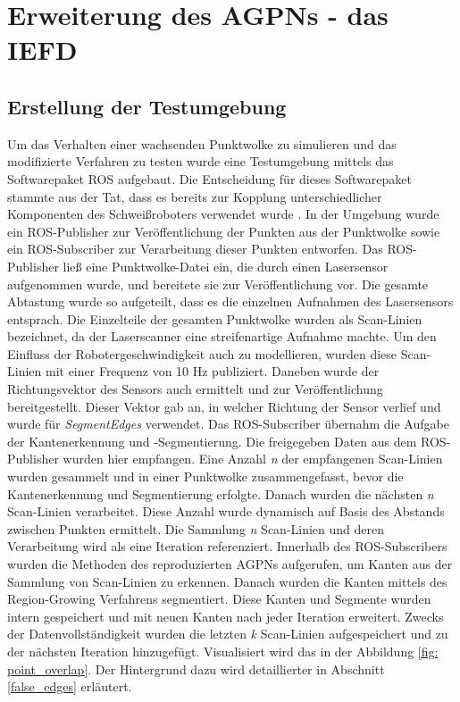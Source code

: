 \section{Erweiterung des AGPNs - das IEFD}
\subsection{Erstellung der Testumgebung}
Um das Verhalten einer wachsenden Punktwolke zu simulieren und das modifizierte Verfahren zu testen wurde eine Testumgebung mittels das Softwarepaket ROS aufgebaut. Die Entscheidung für dieses Softwarepaket stammte aus der Tat, dass es bereits zur Kopplung unterschiedlicher Komponenten des Schweißroboters verwendet wurde \autocite[39]{savla_intelligente_2022}. In der Umgebung wurde ein ROS-Publisher zur Veröffentlichung der Punkten aus der Punktwolke sowie ein ROS-Subscriber zur Verarbeitung dieser Punkten entworfen. Das ROS-Publisher ließ eine Punktwolke-Datei ein, die durch einen Lasersensor aufgenommen wurde, und bereitete sie zur Veröffentlichung vor. Die gesamte Abtastung wurde so aufgeteilt, dass es die einzelnen Aufnahmen des Lasersensors entsprach. Die Einzelteile der gesamten Punktwolke wurden als Scan-Linien bezeichnet, da der Laserscanner eine streifenartige Aufnahme machte. Um den Einfluss der Robotergeschwindigkeit auch zu modellieren, wurden diese Scan-Linien mit einer Frequenz von 10 Hz publiziert. Daneben wurde der Richtungsvektor des Sensors auch ermittelt und zur Veröffentlichung bereitgestellt. Dieser Vektor gab an, in welcher Richtung der Sensor verlief und wurde für \textit{SegmentEdges} verwendet. Das ROS-Subscriber übernahm die Aufgabe der Kantenerkennung und -Segmentierung. Die freigegeben Daten aus dem ROS-Publisher wurden hier empfangen. Eine Anzahl \textit{n} der empfangenen Scan-Linien wurden gesammelt und in einer Punktwolke zusammengefasst, bevor die Kantenerkennung und Segmentierung erfolgte. Danach wurden die nächsten \textit{n} Scan-Linien verarbeitet. Diese Anzahl wurde dynamisch auf Basis des Abstands zwischen Punkten ermittelt. Die Sammlung \textit{n} Scan-Linien und deren Verarbeitung wird als eine Iteration referenziert. Innerhalb des ROS-Subscribers wurden die Methoden des reproduzierten AGPNs aufgerufen, um Kanten aus der Sammlung von Scan-Linien zu erkennen. Danach wurden die Kanten mittels des Region-Growing Verfahrens segmentiert. Diese Kanten und Segmente wurden intern gespeichert und mit neuen Kanten nach jeder Iteration erweitert. Zwecks der Datenvollständigkeit wurden die letzten \textit{k} Scan-Linien aufgespeichert und zu der nächsten Iteration hinzugefügt. Visualisiert wird das in der Abbildung \ref{fig: point_overlap}. Der Hintergrund dazu wird detaillierter in Abschnitt \ref{false_edges} erläutert.

